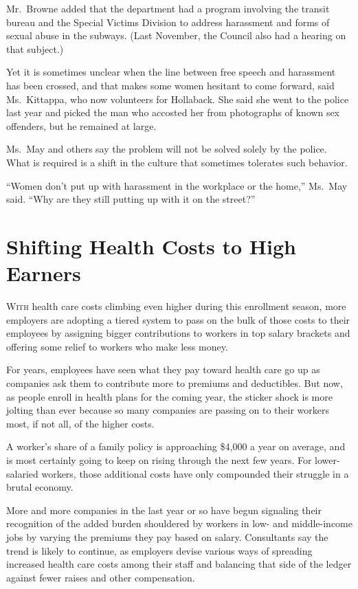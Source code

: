 ﻿\documentclass[12pt]{article}
\begin{document}
Mr.~Browne added that the department had a program involving the transit bureau and the Special
Victims Division to address harassment and forms of sexual abuse in the subways. (Last November, the
Council also had a hearing on that subject.)

Yet it is sometimes unclear when the line between free speech and harassment has been crossed, and
that makes some women hesitant to come forward, said Ms.~Kittappa, who now volunteers for Hollaback.
She said she went to the police last year and picked the man who accosted her from photographs of
known sex offenders, but he remained at large.

Ms.~May and others say the problem will not be solved solely by the police. What is required is a
shift in the culture that sometimes tolerates such behavior.

``Women don't put up with harassment in the workplace or the home,'' Ms.~May said. ``Why are they
still putting up with it on the street?''

\section{Shifting Health Costs to High Earners}

\lettrine{W}{ith} health care costs climbing even higher during this
enrollment season, more employers are adopting a tiered system to pass on the bulk of those costs to
their employees by assigning bigger contributions to workers in top salary brackets and offering
some relief to workers who make less money.

For years, employees have seen what they pay toward health care go up as companies ask them to
contribute more to premiums and deductibles. But now, as people enroll in health plans for the
coming year, the sticker shock is more jolting than ever because so many companies are passing on to
their workers most, if not all, of the higher costs.

A worker's share of a family policy is approaching \$4,000 a year on average, and is most certainly
going to keep on rising through the next few years. For lower-salaried workers, those additional
costs have only compounded their struggle in a brutal economy.

More and more companies in the last year or so have begun signaling their recognition of the added
burden shouldered by workers in low- and middle-income jobs by varying the premiums they pay based
on salary. Consultants say the trend is likely to continue, as employers devise various ways of
spreading increased health care costs among their staff and balancing that side of the ledger
against fewer raises and other compensation.
\end{document}
